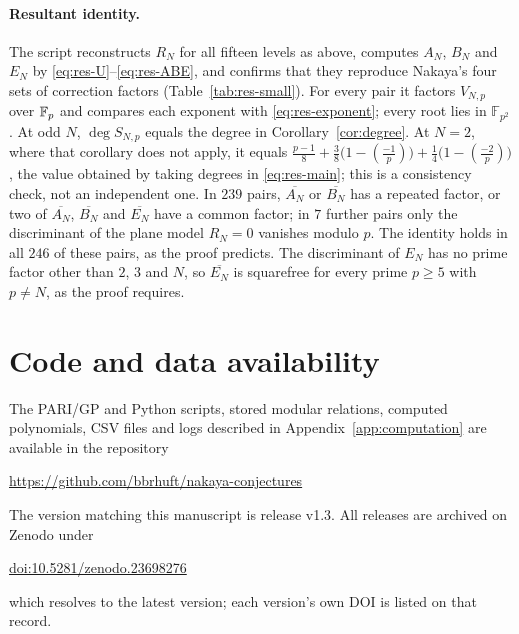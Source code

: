 \documentclass[11pt,a4paper]{article}
\theoremstyle{remark}\newtheorem{remark}[theorem]{Remark}
\numberwithin{equation}{section}
\newcommand{\leg}[2]{\left(\frac{#1}{#2}\right)}
\begin{document}
\paragraph{Resultant identity.} The script reconstructs $R_N$ for all fifteen levels as above, computes $A_N$, $B_N$ and $E_N$ by \eqref{eq:res-U}--\eqref{eq:res-ABE}, and confirms that they reproduce Nakaya's four sets of correction factors (Table~\ref{tab:res-small}). For every pair it factors $V_{N,p}$ over $\mathbb F_p$ and compares each exponent with \eqref{eq:res-exponent}; every root lies in $\mathbb F_{p^2}$. At odd $N$, $\deg S_{N,p}$ equals the degree in Corollary~\ref{cor:degree}. At $N=2$, where that corollary does not apply, it equals $\frac{p-1}8+\frac38\bigl(1-\leg{-1}{p}\bigr)+\frac14\bigl(1-\leg{-2}{p}\bigr)$, the value obtained by taking degrees in \eqref{eq:res-main}; this is a consistency check, not an independent one. In $239$ pairs, $\overline{A_N}$ or $\overline{B_N}$ has a repeated factor, or two of $\overline{A_N}$, $\overline{B_N}$ and $\overline{E_N}$ have a common factor; in $7$ further pairs only the discriminant of the plane model $R_N=0$ vanishes modulo $p$. The identity holds in all $246$ of these pairs, as the proof predicts. The discriminant of $E_N$ has no prime factor other than $2$, $3$ and $N$, so $\overline{E_N}$ is squarefree for every prime $p\geq5$ with $p\neq N$, as the proof requires.

	\section*{Code and data availability}
	The PARI/GP and Python scripts, stored modular relations, computed polynomials, CSV files and logs described in Appendix~\ref{app:computation} are available in the repository
	\begin{center}\url{https://github.com/bbrhuft/nakaya-conjectures}\end{center}
	The version matching this manuscript is release v1.3. All releases are archived on Zenodo under
	\begin{center}\href{https://doi.org/10.5281/zenodo.23698276}{doi:10.5281/zenodo.23698276}\end{center}
	which resolves to the latest version; each version's own DOI is listed on that record.
	
\end{document}
